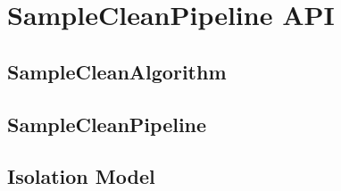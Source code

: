\section{SampleCleanPipeline API}
\subsection{SampleCleanAlgorithm}
\subsection{SampleCleanPipeline}
\subsection{Isolation Model}


